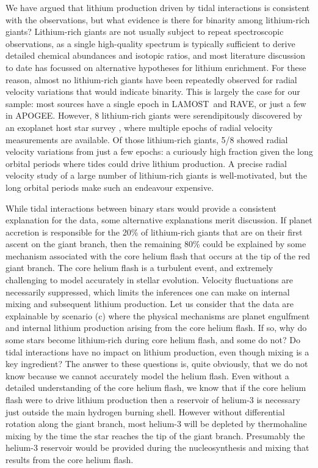 \documentclass[twocolumn]{aastex62}
\newcommand\lamost{LAMOST}
\newcommand\apogee{APOGEE}
\newcommand\rave{RAVE}
\begin{document}
We have argued that lithium production driven by tidal interactions is consistent
with the observations, but what evidence is there for binarity among lithium-rich
giants? Lithium-rich giants are not usually subject to repeat spectroscopic observations,
as a single high-quality spectrum is typically sufficient to derive detailed chemical
abundances and isotopic ratios, and most literature discussion to date has focussed 
on alternative hypotheses for lithium enrichment. For these reason, almost no 
lithium-rich giants have been repeatedly observed for radial velocity variations that would indicate binarity. This is largely the case for our sample: most sources have a single
epoch in \lamost\ and \rave, or just a few in \apogee. 
However, 8 lithium-rich giants were serendipitously discovered by an
exoplanet host star survey \citep{Adamow_2015}, where multiple epochs of radial velocity measurements are available. Of those lithium-rich giants, 5/8 showed radial velocity
variations from just a few epochs: a curiously high fraction given the long orbital periods
where tides could drive lithium production.
A precise radial velocity study of a large number of lithium-rich giants 
is well-motivated, but the long orbital periods make such an endeavour expensive.

While tidal interactions between binary stars would provide a consistent explanation
for the data, some alternative explanations merit discussion. If planet accretion is
responsible for the 20\% of lithium-rich giants that are on their first ascent on the
giant branch, then the remaining 80\% could be explained by some mechanism associated
with the core helium flash that occurs at the tip of the red giant branch. The core
helium flash is a turbulent event, and extremely challenging to model accurately in
stellar evolution. Velocity fluctuations are necessarily suppressed, which limits
the inferences one can make on internal mixing and subsequent lithium production.
Let us consider that the data are explainable by scenario (c) where the 
physical mechanisms are planet engulfment and internal lithium production arising
from the core helium flash. If so, why do some stars become lithium-rich during
core helium flash, and some do not? Do tidal interactions have no impact on lithium
production, even though mixing is a key ingredient?
The answer to these questions is, quite obviously, that we do not
know because we cannot accurately model the helium flash. Even without a detailed
understanding of the core helium flash, we know that if the core helium flash were
to drive lithium production then a reservoir of helium-3 is necessary just outside the main hydrogen burning shell. However without differential rotation along the giant branch, most helium-3 will be depleted by thermohaline mixing by the time the star reaches the tip of the giant branch.
Presumably the helium-3 reservoir would be provided during the nucleosynthesis and mixing 
that results from the core helium flash. 
\end{document}
